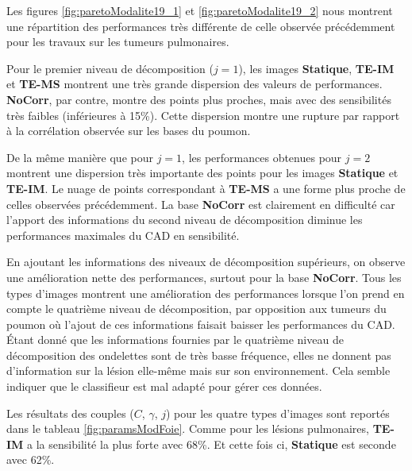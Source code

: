 Les figures \ref{fig:paretoModalite19_1} et \ref{fig:paretoModalite19_2} nous montrent une répartition des performances très différente de celle observée précédemment pour les travaux sur les tumeurs pulmonaires. 

Pour le premier niveau de décomposition ($j=1$), les images \textbf{Statique}, \textbf{TE-IM} et \textbf{TE-MS} montrent une très grande dispersion des valeurs de performances. \textbf{NoCorr}, par contre, montre des points plus proches, mais avec des sensibilités très faibles (inférieures à 15\%). Cette dispersion montre une rupture par rapport à la corrélation observée sur les bases du poumon.

De la même manière que pour $j=1$, les performances obtenues pour $j=2$ montrent une dispersion très importante des points pour les images \textbf{Statique} et \textbf{TE-IM}. Le nuage de points correspondant à \textbf{TE-MS} a une forme plus proche de celles observées précédemment. La base \textbf{NoCorr} est clairement en difficulté car l'apport des informations du second niveau de décomposition diminue les performances maximales du CAD en sensibilité.

En ajoutant les informations des niveaux de décomposition supérieurs, on observe une amélioration nette des performances, surtout pour la base \textbf{NoCorr}. Tous les types d'images montrent une amélioration des performances lorsque l'on  prend en compte le quatrième niveau de décomposition, par opposition aux tumeurs du poumon où l'ajout de ces informations faisait baisser les performances du CAD. \'Etant donné que les informations fournies par le quatrième niveau de décomposition des ondelettes sont de très basse fréquence, elles ne donnent pas d'information sur la lésion elle-même mais sur son environnement. Cela semble indiquer que le classifieur est mal adapté pour gérer ces données.


Les résultats des couples ($C$, $\gamma$, $j$) pour les quatre types d'images sont reportés dans le tableau \ref{fig:paramsModFoie}. Comme pour les lésions pulmonaires, \textbf{TE-IM} a la sensibilité la plus forte avec 68\%. Et cette fois ci, \textbf{Statique} est seconde avec 62\%.

